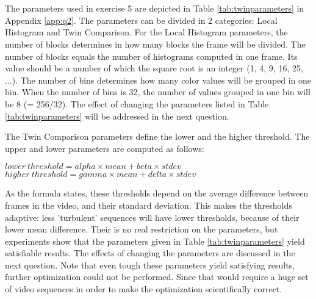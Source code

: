 \section[A table documenting the different parameters used, as well as explanatory notes
regarding the definition and the range of these different parameters. Also, add a
rationale for the different parameter settings used (this is, how did you restrict the
parameter settings to a meaningful subset?).]{}The parameters used in exercise 5 are depicted in Table \ref{tab:twinparameters} in Appendix \ref{app:q2}. The parameters can be divided in 2 categories: Local Histogram and Twin Comparison. For the Local Histogram parameters, the number of blocks determines in how many blocks the frame will be divided. The number of blocks equals the number of histograms computed in one frame. Its value should be a number of which the square root is an integer (1, 4, 9, 16, 25, ...). The number of bins determines how many color values will be grouped in one bin. When the number of bins is 32, the number of values grouped in one bin will be 8 (= 256/32). The effect of changing the parameters listed in Table \ref{tab:twinparameters} will be addressed in the next question. 

The Twin Comparison parameters define the lower and the higher threshold. The upper and lower parameters are computed as follows:
\begin{center}
$lower \: threshold = alpha\times mean + beta\times stdev$\\$
higher \: threshold = gamma\times mean + delta\times stdev$
\end{center}
As the formula states, these thresholds depend on the average difference between frames in the video, and their standard deviation. This makes the thresholds adaptive: less 'turbulent' sequences will have lower thresholds, because of their lower mean difference. Their is no real restriction on the parameters, but experiments show that the parameters given in Table \ref{tab:twinparameters} yield satisfiable results. The effects of changing the parameters are discussed in the next question. Note that even tough these parameters yield satisfying results, further optimization could not be performed. Since that would require a huge set of video sequences in order to make the optimization scientifically correct. \\
